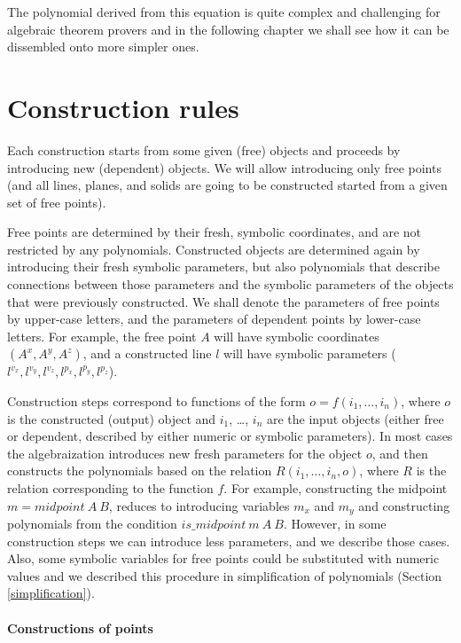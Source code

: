 \documentclass[final,1p,times,authoryear]{elsarticle}
\begin{document}
\begin{description}
The polynomial derived from this equation is quite complex and
challenging for algebraic theorem provers and in the following chapter
we shall see how it can be dissembled onto more simpler ones.
\end{description}


\section{Construction rules}
Each construction starts from some given (free) objects and proceeds
by introducing new (dependent) objects. We will allow introducing only
free points (and all lines, planes, and solids are going to be
constructed started from a given set of free points).

Free points are determined by their fresh, symbolic coordinates, and
are not restricted by any polynomials. Constructed objects are
determined again by introducing their fresh symbolic parameters, but
also polynomials that describe connections between those parameters
and the symbolic parameters of the objects that were previously
constructed. We shall denote the parameters of free points by
upper-case letters, and the parameters of dependent points by
lower-case letters. For example, the free point $A$ will have symbolic
coordinates $({A}^x, {A}^y, {A}^z)$, and a constructed line $l$ will
have symbolic parameters (${l}^{v_x}, {l}^{v_y}, {l}^{v_z}, {l}^{p_x},
{l}^{p_y}, {l}^{p_z}$).

Construction steps correspond to functions of the form $o = f(i_1,
\ldots, i_n)$, where $o$ is the constructed (output) object and $i_1$,
\ldots, $i_n$ are the input objects (either free or dependent,
described by either numeric or symbolic parameters). In most cases the
algebraization introduces new fresh parameters for the object $o$, and
then constructs the polynomials based on the relation $R(i_1, \ldots,
i_n, o)$, where $R$ is the relation corresponding to the function $f$.
For example, constructing the midpoint $m = midpoint\ A\ B$, reduces
to introducing variables $m_x$ and $m_y$ and constructing polynomials
from the condition $is\_midpoint\ m\ A\ B$. However, in some
construction steps we can introduce less parameters, and we describe
those cases. Also, some symbolic variables for free points could be
substituted with numeric values and we described this procedure in
simplification of polynomials (Section \ref{simplification}).

\paragraph{Constructions of points}
\end{document}

